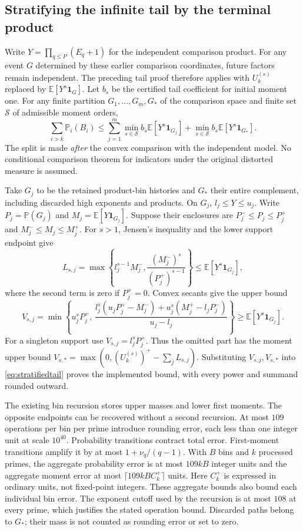 \documentclass[11pt]{article}
\newcommand{\E}{\mathbb E}
\newcommand{\Pp}{\mathbb P}
\begin{document}
\subsection{Stratifying the infinite tail by the terminal product}
\label{sec:stratifiedtail}
Write $Y=\prod_{q\leq P}(E_q+1)$ for the independent comparison product.
For any event $G$ determined by these earlier comparison coordinates,
future factors remain independent. The preceding tail proof therefore
applies with $U_k^{(s)}$ replaced by $\E[Y^s\mathbf1_G]$. Let $b_s$ be
the certified tail coefficient for initial moment one. For any finite
partition $G_1,\ldots,G_m,G_*$ of the comparison space and finite set
$\mathcal S$ of admissible moment orders,
\begin{equation}\label{eq:stratifiedtail}
 \sum_{i>k}\Pp_i(B_i)
 \leq\sum_{j=1}^m\min_{s\in\mathcal S}
                 b_s\E[Y^s\mathbf1_{G_j}]
       +\min_{s\in\mathcal S}b_s\E[Y^s\mathbf1_{G_*}].
\end{equation}
The split is made \emph{after} the convex comparison with the independent
model. No conditional comparison theorem for indicators under the original
distorted measure is assumed.

Take $G_j$ to be the retained product-bin histories and $G_*$ their entire
complement, including discarded high exponents and products. On $G_j$,
$l_j\leq Y\leq u_j$. Write $P_j=\Pp(G_j)$ and
$M_j=\E[Y\mathbf1_{G_j}]$. Suppose their enclosures are
$P_j^-\leq P_j\leq P_j^+$ and $M_j^-\leq M_j\leq M_j^+$.
For $s>1$, Jensen's inequality and the lower support endpoint give
\[
 L_{s,j}=\max\left\{l_j^{s-1}M_j^-,
             \frac{(M_j^-)^s}{(P_j^+)^{s-1}}\right\}
 \leq\E[Y^s\mathbf1_{G_j}],
\]
where the second term is zero if $P_j^+=0$.
Convex secants give the upper bound
\[
 V_{s,j}=\min\left\{u_j^sP_j^+,\,
 \frac{l_j^s(u_jP_j^+-M_j^-)
       +u_j^s(M_j^+-l_jP_j^-)}{u_j-l_j}\right\}
 \geq\E[Y^s\mathbf1_{G_j}].
\]
For a singleton support use $V_{s,j}=l_j^sP_j^+$.
Thus the omitted part has the moment upper bound
$V_{s,*}=\max(0,(U_k^{(s)})^+-\sum_j L_{s,j})$.
Substituting $V_{s,j},V_{s,*}$ into \eqref{eq:stratifiedtail} proves
the implemented bound, with every power and summand rounded outward.

The existing bin recursion stores upper masses and lower first moments.
The opposite endpoints can be recovered without a second recursion.
At most $109$ operations per bin per prime introduce rounding error,
each less than one integer unit at scale $10^{40}$. Probability
transitions contract total error. First-moment transitions amplify it
by at most $1+\nu_q/(q-1)$. With $B$ bins and $k$ processed primes,
the aggregate probability error is at most $109kB$ integer units and
the aggregate moment error at most
$\lceil109kB C_k^+\rceil$ units. Here $C_k^+$ is expressed in ordinary
units, not fixed-point integers. These aggregate bounds also bound each
individual bin error. The exponent cutoff used by the recursion is at
most $108$ at every prime, which justifies the stated operation bound.
Discarded paths belong to $G_*$; their mass is not counted as rounding
error or set to zero.
\end{document}
